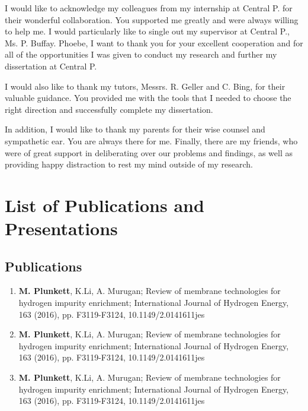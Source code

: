 \documentclass[a4paper,12pt]{report}
\begin{document}
I would like to acknowledge my colleagues from my internship at Central P. for their wonderful collaboration. You supported me greatly and were always willing to help me. I would particularly like to single out my supervisor at Central P., Ms. P. Buffay. Phoebe, I want to thank you for your excellent  cooperation  and  for  all  of  the  opportunities  I  was  given  to  conduct  my  research  and further my dissertation at Central P.

I would also like to thank my tutors, Messrs. R. Geller and C. Bing, for their valuable guidance. You  provided  me  with  the  tools  that  I  needed  to  choose  the  right  direction  and  successfully complete my dissertation.

In addition, I would like to thank my parents for their wise counsel and sympathetic ear. You are always there for me. Finally, there are my friends, who were of great support in deliberating over our problems and findings, as well as providing happy distraction to rest my mind outside of my research. 

\chapter*{List of Publications and Presentations}

\section*{Publications}
\begin{enumerate}
    \item \textbf{M. Plunkett}, K.Li, A. Murugan; Review of membrane technologies for hydrogen impurity enrichment; International Journal of Hydrogen Energy, 163 (2016), pp. F3119-F3124, 10.1149/2.0141611jes
    \item \textbf{M. Plunkett}, K.Li, A. Murugan; Review of membrane technologies for hydrogen impurity enrichment; International Journal of Hydrogen Energy, 163 (2016), pp. F3119-F3124, 10.1149/2.0141611jes
    \item \textbf{M. Plunkett}, K.Li, A. Murugan; Review of membrane technologies for hydrogen impurity enrichment; International Journal of Hydrogen Energy, 163 (2016), pp. F3119-F3124, 10.1149/2.0141611jes

\end{enumerate}
\end{document}
